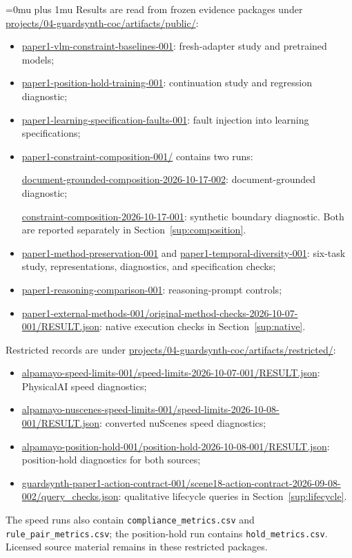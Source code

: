 \documentclass[10pt]{article}
\begin{document}
\begingroup
\Urlmuskip=0mu plus 1mu\relax
Results are read from frozen evidence packages under
\url{projects/04-guardsynth-coc/artifacts/public/}:
\begin{itemize}
\item \url{paper1-vlm-constraint-baselines-001}: fresh-adapter study and pretrained models;
\item \url{paper1-position-hold-training-001}: continuation study and regression diagnostic;
\item \url{paper1-learning-specification-faults-001}: fault injection into learning specifications;
\item \begingroup\raggedright
\url{paper1-constraint-composition-001/} contains two runs:\par
\url{document-grounded-composition-2026-10-17-002}: document-grounded diagnostic;\par
\url{constraint-composition-2026-10-17-001}: synthetic boundary diagnostic.
Both are reported separately in Section~\ref{sup:composition}.\par\endgroup
\item \url{paper1-method-preservation-001} and \url{paper1-temporal-diversity-001}: six-task study, representations, diagnostics, and specification checks;
\item \url{paper1-reasoning-comparison-001}: reasoning-prompt controls;
\item \url{paper1-external-methods-001/original-method-checks-2026-10-07-001/RESULT.json}: native execution checks in Section~\ref{sup:native}.
\end{itemize}
Restricted records are under
\url{projects/04-guardsynth-coc/artifacts/restricted/}:
\begin{itemize}
\item \url{alpamayo-speed-limits-001/speed-limits-2026-10-07-001/RESULT.json}: PhysicalAI speed diagnostics;
\item \url{alpamayo-nuscenes-speed-limits-001/speed-limits-2026-10-08-001/RESULT.json}: converted nuScenes speed diagnostics;
\item \url{alpamayo-position-hold-001/position-hold-2026-10-08-001/RESULT.json}: position-hold diagnostics for both sources;
\item \url{guardsynth-paper1-action-contract-001/scene18-action-contract-2026-09-08-002/query_checks.json}: qualitative lifecycle queries in Section~\ref{sup:lifecycle}.
\end{itemize}
The speed runs also contain \texttt{compliance\_metrics.csv} and
\texttt{rule\_pair\_metrics.csv}; the position-hold run contains
\texttt{hold\_metrics.csv}. Licensed source material remains in these restricted packages.
\endgroup
\end{document}
